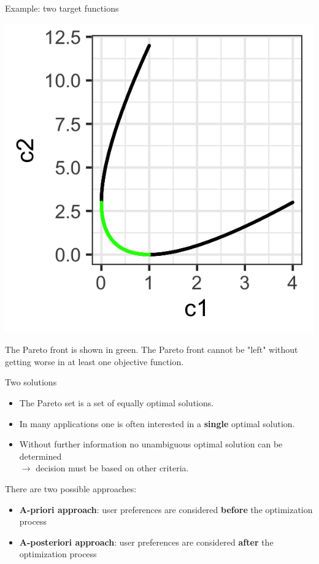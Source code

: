 \begin{frame}[allowframebreaks]{Example: two target functions}
    \begin{center}
    \includegraphics[scale=0.2]{images/graph3}
    \end{center}
    \vspace*{-0.3cm}

The Pareto front is shown in green.
The Pareto front cannot be "left" without getting worse in at least one objective function.

\end{frame}


\begin{frame}{Two solutions}

\begin{itemize}
\item The Pareto set is a set of equally optimal solutions.
\item In many applications one is often interested in a \textbf{single} optimal solution.
\item Without further information no unambiguous optimal solution can be determined \\
$\to$ decision must be based on other criteria.
\end{itemize}

There are two possible approaches:
\begin{itemize}
\item \textbf{A-priori approach}: user preferences are considered \textbf{before} the optimization process
\item \textbf{A-posteriori approach}: user preferences are considered \textbf{after} the optimization process
\end{itemize}

\end{frame}

